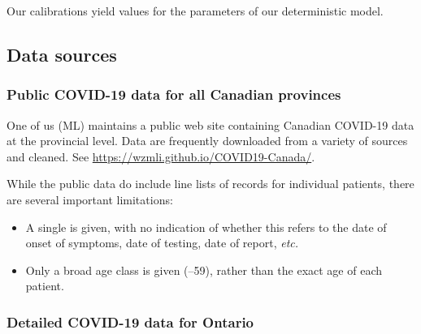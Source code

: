 \documentclass[12pt]{article}\usepackage[]{graphicx}\usepackage[]{color}
\begin{document}
Our calibrations yield values for the parameters of our
deterministic model.

\subsection{Data sources}


\subsubsection*{Public COVID-19 data for all Canadian provinces}

One of us (ML) maintains a public web site containing Canadian
COVID-19 data at the provincial level.  Data are frequently downloaded
from a variety of sources and cleaned.  See
\url{https://wzmli.github.io/COVID19-Canada/}.

While the public data do include line lists of records for individual
patients, there are several important limitations:
\begin{itemize}
\item A single  is given, with no indication of
  whether this refers to the date of onset of symptoms, date of
  testing, date of report, \emph{etc.}
\item Only a broad age class is given (--59), rather than the
  exact age of each patient.
\end{itemize}

\subsubsection*{Detailed COVID-19 data for Ontario}
\end{document}
